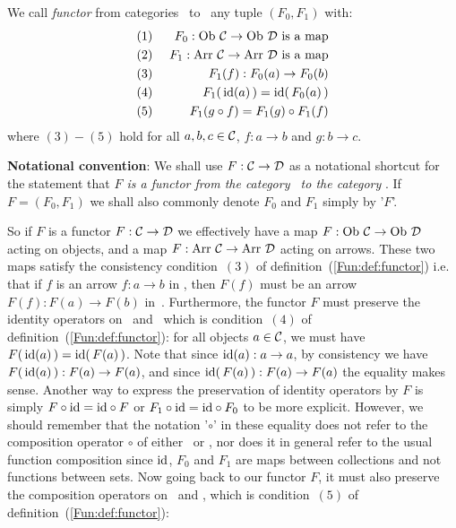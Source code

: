 \begin{defin}\label{Fun:def:functor}
    We call {\em functor} from categories \Cat\ to \Dat\ any tuple 
    $(F_{0},F_{1})$ with:
        \begin{eqnarray*}
            (1)&\ &F_{0}:\mbox{\rm Ob}\ \mbox{$\cal C$}\to\mbox{\rm Ob}\ \mbox{$\cal D$}\mbox{\ is a map}\\
            (2)&\ &F_{1}:\mbox{\rm Arr}\ \mbox{$\cal C$}\to\mbox{\rm Arr}\ \mbox{$\cal D$}\mbox{\ is a map}\\
            (3)&\ &F_{1}(f):F_{0}(a)\to F_{0}(b)\\
            (4)&\ &F_{1}(\,\mbox{\rm id}(a)\,)=\mbox{\rm id}(\,F_{0}(a)\,)\\
            (5)&\ &F_{1}(g\circ f)=F_{1}(g)\circ F_{1}(f)
    \end{eqnarray*}
    where $(3)-(5)$ hold for all $a,b,c\in\mbox{$\cal C$}$, $f:a\to b$ and $g:b\to c$.
\end{defin}
\noindent
{\bf Notational convention}: We shall use $F:\mbox{$\cal C$}\to\mbox{$\cal D$}$ as a notational 
shortcut for the statement that {\em $F$ is a functor from the category
\Cat\ to the category \Dat}. If $F=(F_{0},F_{1})$ we shall also commonly 
denote $F_{0}$ and $F_{1}$ simply by '$F$'.

So if $F$ is a functor $F:\mbox{$\cal C$}\to\mbox{$\cal D$}$ we effectively have a map 
$F:\ob\ \Cat\to\ob\ \Dat$ acting on objects, and a map 
$F:\mbox{\rm Arr}\ \mbox{$\cal C$}\to\mbox{\rm Arr}\ \mbox{$\cal D$}$ acting on arrows. These two maps 
satisfy the consistency condition~$(3)$ of definition~(\ref{Fun:def:functor})
i.e. that if $f$ is an arrow $f:a\to b$ in \Cat, then $F(f)$ must be 
an arrow $F(f):F(a)\to F(b)$ in~\Dat. Furthermore, the functor
$F$ must preserve the identity operators on \Cat\ and \Dat\ which
is condition~$(4)$ of definition~(\ref{Fun:def:functor}): for all objects
$a\in\mbox{$\cal C$}$, we must have $F(\,\mbox{\rm id}(a)\,)=\mbox{\rm id}(\,F(a)\,)$. Note that since
$\mbox{\rm id}(a):a\to a$, by consistency we have $F(\,\mbox{\rm id}(a)\,):F(a)\to F(a)$,
and since $\mbox{\rm id}(\,F(a)\,):F(a)\to F(a)$ the equality makes sense.
Another way to express the preservation of identity operators by $F$
is simply $F\circ\mbox{\rm id}=\mbox{\rm id}\circ F$ or $F_{1}\circ\mbox{\rm id}=\mbox{\rm id}\circ F_{0}$ to 
be more explicit. However, we should remember that the notation '$\circ$'
in these equality does not refer to the composition operator $\circ$
of either \Cat\ or \Dat, nor does it in general refer to the usual
function composition since $\mbox{\rm id}$, $F_{0}$ and $F_{1}$ are maps between 
collections and not functions between sets. Now going back to our
functor $F$, it must also preserve the composition operators on
\Cat\ and \Dat, which is condition~$(5)$ of definition~(\ref{Fun:def:functor}):

